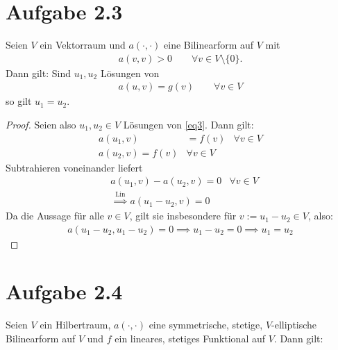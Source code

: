 \documentclass[12pt,a4paper]{article}
\begin{document}
\section*{Aufgabe 2.3}
Seien $V$ ein Vektorraum und $a(\cdot,\cdot)$ eine Bilinearform auf $V$ mit
\begin{align*}
a(v,v)>0\qquad\forall v\in V\setminus\lbrace0\rbrace.
\end{align*}
Dann gilt: Sind $u_1,u_2$ Lösungen von
\begin{align}\label{eq3}
a(u,v)=g(v)\qquad\forall v\in V
\end{align}
so gilt $u_1=u_2$.

\begin{proof}
Seien also $u_1,u_2\in V$ Lösungen von \eqref{eq3}. Dann gilt:
\begin{align*}
a(u_1,v) &=f(v) &\forall v\in V\\
a(u_2,v)=f(v) &\forall v\in V
\end{align*}
Subtrahieren voneinander liefert
\begin{align*}
&a(u_1,v)-a(u_2,v)=0 &\forall v\in V\\
&\stackrel{\text{Lin}}{\implies}
a(u_1-u_2,v)=0
\end{align*}
Da die Aussage für alle $v\in V$, gilt sie insbesondere für $v:=u_1-u_2\in V$, also:
\begin{align*}
a(u_1-u_2,u_1-u_2)=0\implies u_1-u_2=0\implies u_1=u_2
\end{align*}
\end{proof}


\section*{Aufgabe 2.4}
Seien $V$ ein Hilbertraum, $a(\cdot,\cdot)$ eine symmetrische, stetige, $V$-elliptische Bilinearform auf $V$ und $f$ ein lineares, stetiges Funktional auf $V$. Dann gilt:
\end{document}
